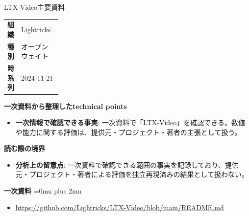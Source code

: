 \begin{technicalnote}{LTX-Video}{主要資料}
\begingroup
\begin{tabularx}{\linewidth}{@{}>{\bfseries}p{0.22\linewidth}X@{}}
組織 & Lightricks \\
種別 & オープンウェイト \\
時系列 & 2024-11-21 \\
\end{tabularx}
\smallskip
{\bfseries 一次資料から整理したtechnical points}
\begin{itemize}[leftmargin=1.5em,itemsep=0.35em]
\item \textbf{一次情報で確認できる事実}: 一次資料で「LTX-Video」を確認できる。数値や能力に関する評価は、提供元・プロジェクト・著者の主張として扱う。
\end{itemize}
\begin{minipage}{\linewidth}
{\bfseries 読む際の境界}
\begin{itemize}[leftmargin=1.5em,itemsep=0.35em]
\item \textbf{分析上の留意点}: 一次資料で確認できる範囲の事実を記録しており、提供元・プロジェクト・著者による評価を独立再現済みの結果として扱わない。
\end{itemize}
\begin{samepage}
{\bfseries 一次資料}
\begingroup\sloppy
\Urlmuskip=0mu plus 2mu\relax
\begin{itemize}[leftmargin=1.5em,itemsep=0.25em]
\item {\scriptsize\url{https://github.com/Lightricks/LTX-Video/blob/main/README.md}}
\end{itemize}
\endgroup
\end{samepage}
\end{minipage}
\endgroup
\end{technicalnote}
\medskip

